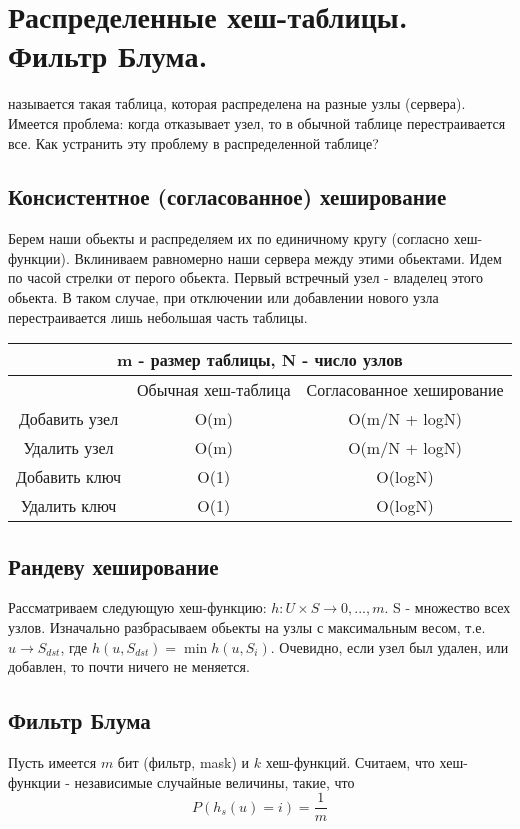 \section{Распределенные хеш-таблицы. Фильтр Блума.}
 называется такая таблица, которая распределена на разные узлы (сервера).
Имеется проблема: когда отказывает узел, то в обычной таблице перестраивается все. Как устранить эту проблему в распределенной таблице?
\subsection {Консистентное (согласованное) хеширование}
Берем наши обьекты и распределяем их по единичному кругу (согласно хеш-функции). Вклиниваем равномерно наши сервера между этими обьектами. Идем по часой стрелки от перого обьекта. Первый встречный узел - владелец этого обьекта. В таком случае, при отключении или добавлении нового узла перестраивается лишь небольшая часть таблицы.\\
\begin{tabular}{|c|c|c|}
\hline
\multicolumn{3}{|c|}{m - размер таблицы, N - число узлов}       \\ \hline
              & Обычная хеш-таблица & Согласованное хеширование \\ \hline
Добавить узел & O(m)                & O(m/N + logN)             \\ \hline
Удалить узел  & O(m)                & O(m/N + logN)             \\ \hline
Добавить ключ & O(1)                & O(logN)                   \\ \hline
Удалить ключ  & O(1)                & O(logN)                   \\ \hline
\end{tabular}

\subsection {Рандеву хеширование}
Рассматриваем следующую хеш-функцию: $h: U \times S \rightarrow {0, ..., m}$. S - множество всех узлов. Изначально разбрасываем обьекты на узлы с максимальным весом, т.е. 
$u \rightarrow S_{dst}$, где $h(u, S_{dst}) = \min h(u, S_i)$. Очевидно, если узел был удален, или добавлен, то почти ничего не меняется.


\subsection {Фильтр Блума}
Пусть имеется $m$ бит (фильтр, mask) и $k$ хеш-функций. Считаем, что хеш-функции - независимые случайные величины, такие, что 
$$P(h_s(u) = i) = \frac{1}{m}$$

